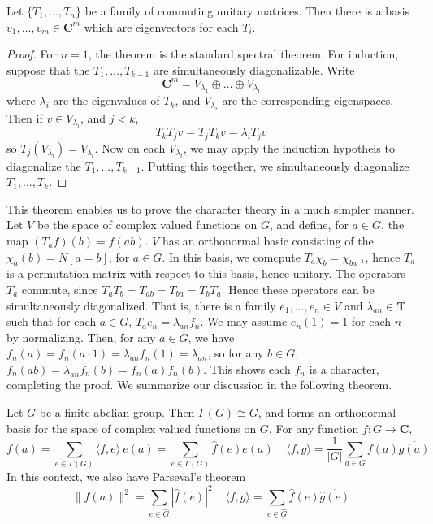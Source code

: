 \begin{theorem}
    Let $\{ T_1, \dots, T_n \}$ be a family of commuting unitary matrices. Then there is a basis $v_1, \dots, v_m \in \mathbf{C}^m$ which are eigenvectors for each $T_i$.
\end{theorem}
\begin{proof}
    For $n = 1$, the theorem is the standard spectral theorem. For induction, suppose that the $T_1, \dots, T_{k-1}$ are simultaneously diagonalizable. Write
    \[ \mathbf{C}^m = V_{\lambda_1} \oplus \dots \oplus V_{\lambda_l} \]
    where $\lambda_i$ are the eigenvalues of $T_k$, and $V_{\lambda_i}$ are the corresponding eigenspaces. Then if $v \in V_{\lambda_i}$, and $j < k$,
    \[ T_k T_j v = T_j T_k v = \lambda_i T_j v \]
    so $T_j(V_{\lambda_i}) = V_{\lambda_i}$. Now on each $V_{\lambda_i}$, we may apply the induction hypotheis to diagonalize the $T_1, \dots, T_{k-1}$. Putting this together, we simultaneously diagonalize $T_1, \dots, T_k$.
\end{proof}

This theorem enables us to prove the character theory in a much simpler manner. Let $V$ be the space of complex valued functions on $G$, and define, for $a \in G$, the map $(T_a f)(b) = f(ab)$. $V$ has an orthonormal basic consisting of the $\chi_a(b) = N [a = b]$, for $a \in G$. In this basis, we comcpute $T_a \chi_b = \chi_{ba^{-1}}$, hence $T_a$ is a permutation matrix with respect to this basis, hence unitary. The operators $T_a$ commute, since $T_aT_b = T_{ab} = T_{ba} = T_b T_a$. Hence these operators can be simultaneously diagonalized. That is, there is a family $e_1, \dots, e_n \in V$ and $\lambda_{an} \in \mathbf{T}$ such that for each $a \in G$, $T_a e_n = \lambda_{an} f_n$. We may assume $e_n(1) = 1$ for each $n$ by normalizing. Then, for any $a \in G$, we have $f_n(a) = f_n(a \cdot 1) = \lambda_{an} f_n(1) = \lambda_{an}$, so for any $b \in G$, $f_n(ab) = \lambda_{an} f_n(b) = f_n(a) f_n(b)$. This shows each $f_n$ is a character, completing the proof. We summarize our discussion in the following theorem.

\begin{theorem}
    Let $G$ be a finite abelian group. Then $\Gamma(G) \cong G$, and forms an orthonormal basis for the space of complex valued functions on $G$. For any function $f: G \to \mathbf{C}$,
    \[ f(a) = \sum_{e \in \Gamma(G)} \langle f, e \rangle\ e(a) = \sum_{e \in \Gamma(G)} \hat{f}(e) e(a)\ \ \ \ \ \langle f, g \rangle = \frac{1}{|G|} \sum_{a \in G} f(a) \overline{g(a)} \]
    In this context, we also have Parseval's theorem
    \[ \| f(a) \|^2 = \sum_{e \in \hat{G}} |\widehat{f}(e)|^2\ \ \ \ \ \langle f, g \rangle = \sum_{e \in \hat{G}} \widehat{f}(e) \overline{\widehat{g}(e)} \]
\end{theorem}

